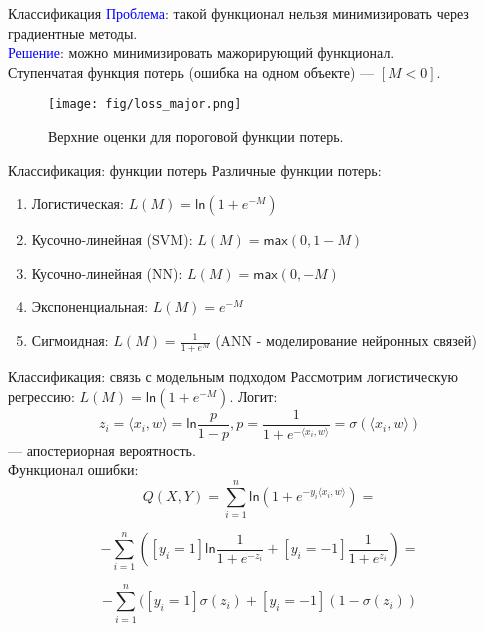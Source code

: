 \documentclass[handout]{beamer}
\begin{document}
\begin{frame}{Классификация}
	\small
	\textcolor{blue}{Проблема}: такой функционал нельзя минимизировать через градиентные методы.\\
	\textcolor{blue}{Решение}: можно минимизировать мажорирующий функционал.\\
	Ступенчатая функция потерь (ошибка на одном объекте) --- $[M < 0]$.
	\begin{figure}
	    \texttt{[image: fig/loss\_major.png]}
	    \caption{\small Верхние оценки для пороговой функции потерь.
	    } 
	    \label{fig:w_series}
	\end{figure}

\end{frame}

\begin{frame}{Классификация: функции потерь}
	Различные функции потерь:
	\vspace*{5pt}
	\begin{enumerate}
		\item Логистическая: $L(M) = \mathsf{ln}(1+e^{-M})$
		\vspace*{5pt}
		\item Кусочно-линейная (SVM): $L(M) = \mathsf{max}(0, 1-M)$
\vspace*{5pt}
		\item  Кусочно-линейная (NN): $L(M) = \mathsf{max}(0, -M)$
\vspace*{5pt}
		\item Экспоненциальная: $L(M) = e^{-M}$
\vspace*{5pt}
		\item Сигмоидная: $L(M) = \frac{1}{1+e^M}$ (ANN - моделирование нейронных связей)
	\end{enumerate}
\end{frame}

\begin{frame}{Классификация: связь с модельным подходом}
	Рассмотрим логистическую регрессию: $L(M)= \mathsf{ln}(1+e^{-M})$.
	Логит:
	\begin{equation}
		z_i=\langle x_i, w\rangle = \mathsf{ln}\frac{p}{1 - p}, p = \frac{1}{1+e^{-\langle x_i, w\rangle}}=\sigma(\langle x_i, w\rangle)
	\end{equation}
	--- апостериорная вероятность. \\
	Функционал ошибки:
	\begin{equation*}
		Q(X, Y) = \sum_{i=1}^{n}\mathsf{ln}(1+e^{-y_i\langle x_i, w\rangle}) =
	\end{equation*}

	\begin{equation*}
 -\sum_{i=1}^n([y_i=1]\mathsf{ln}\frac{1}{1+e^{-z_i}}+[y_i=-1]\frac{1}{1+e^{z_i}})=
	\end{equation*}

	\begin{equation*}
	-\sum_{i=1}^n([y_i=1]\sigma(z_i)+[y_i=-1](1-\sigma(z_i))
	\end{equation*}
\end{frame}
\end{document}

